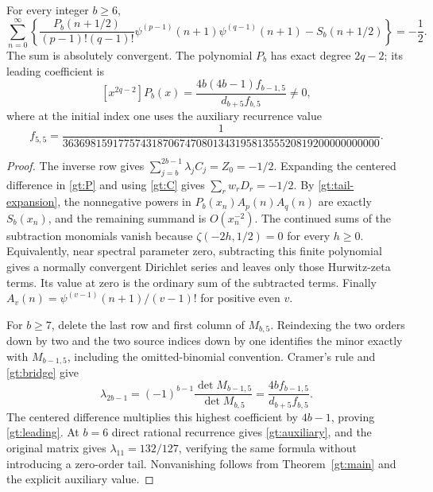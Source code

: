 \begin{corollary}
\label{gt:ordinary}
For every integer $b\ge6$,
\begin{equation}\label{gt:ordinary-sum}
 \boxed{\displaystyle
 \sum_{n=0}^{\infty}\left\{
 \frac{P_b(n+1/2)}{(p-1)!(q-1)!}
   \psi^{(p-1)}(n+1)\psi^{(q-1)}(n+1)-S_b(n+1/2)
                         \right\}=-\frac12.}
\end{equation}
The sum is absolutely convergent. The polynomial $P_b$ has exact
degree $2q-2$; its leading coefficient is
\begin{equation}\label{gt:leading}
 [x^{2q-2}]P_b(x)=
       \frac{4b(4b-1)f_{b-1,5}}{d_{b+5}f_{b,5}}\ne0,
\end{equation}
where at the initial index one uses the auxiliary recurrence value
\begin{equation}\label{gt:auxiliary}
 f_{5,5}=
 \frac1{363698159177574318706747080134319581355520819200000000000}.
\end{equation}
\end{corollary}

\begin{proof}
The inverse row gives $\sum_{j=b}^{2b-1}\lambda_jC_j=Z_0=-1/2$.
Expanding the centered difference in \eqref{gt:P} and using
\eqref{gt:C} gives $\sum_rw_rD_r=-1/2$.
By \eqref{gt:tail-expansion}, the nonnegative powers in
$P_b(x_n)A_p(n)A_q(n)$ are exactly $S_b(x_n)$, and the remaining
summand is $O(x_n^{-2})$. The continued sums of the subtraction
monomials vanish because $\zeta(-2h,1/2)=0$ for every $h\ge0$.
Equivalently, near spectral parameter zero, subtracting this finite
polynomial gives a normally convergent Dirichlet series and leaves
only those Hurwitz-zeta terms. Its value at zero is the ordinary
sum of the subtracted terms. Finally
$A_v(n)=\psi^{(v-1)}(n+1)/(v-1)!$ for positive even $v$.

For $b\ge7$, delete the last row and first column of $M_{b,5}$.
Reindexing the two orders down by two and the two source indices
down by one identifies the minor exactly with $M_{b-1,5}$,
including the omitted-binomial convention. Cramer's rule and
\eqref{gt:bridge} give
\[
 \lambda_{2b-1}=(-1)^{b-1}\frac{\det M_{b-1,5}}{\det M_{b,5}}
               =\frac{4b f_{b-1,5}}{d_{b+5}f_{b,5}}.
\]
The centered difference multiplies this highest coefficient by
$4b-1$, proving \eqref{gt:leading}. At $b=6$ direct rational
recurrence gives \eqref{gt:auxiliary}, and the original matrix
gives $\lambda_{11}=132/127$, verifying the same formula without
introducing a zero-order tail. Nonvanishing follows from
Theorem~\ref{gt:main} and the explicit auxiliary value.
\end{proof}

